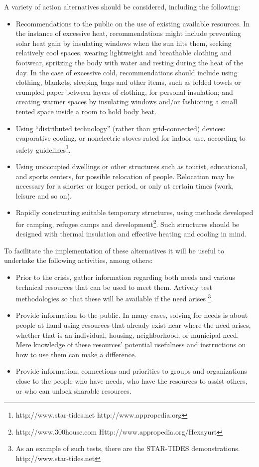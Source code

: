 \documentclass[12pt, a4]{scrartcl}
\begin{document}
A variety of action alternatives should be considered, including the following:
\begin{itemize}
	\item Recommendations to the public on the use of existing available resources. In the instance of excessive heat, recommendations might include preventing solar heat gain by insulating windows when the sun hits them, seeking relatively cool spaces, wearing lightweight and breathable clothing and footwear, spritzing the body with water and resting during the heat of the day. In the case of excessive cold, recommendations should include using clothing, blankets, sleeping bags and other items, such as folded towels or crumpled paper between layers of clothing, for personal insulation; and creating warmer spaces by insulating windows and/or fashioning a small tented space inside a room to hold body heat.
	\item Using “distributed technology” (rather than grid-connected) devices: evaporative cooling, or nonelectric stoves rated for indoor use, according to safety guidelines\footnote{http://www.star-tides.net http://www.appropedia.org}.
	\item Using unoccupied dwellings or other structures such as tourist, educational, and sports centers, for possible relocation of people. Relocation may be necessary for a shorter or longer period, or only at certain times (work, leisure and so on).
	\item Rapidly constructing suitable temporary structures, using methods developed for camping, refugee camps and development\footnote{http://www.300house.com Http://www.appropedia.org/Hexayurt}. Such structures should be designed with thermal insulation and effective heating and cooling in mind.
\end{itemize}

To facilitate the implementation of these alternatives it will be useful to undertake the following activities, among others:
\begin{itemize}
	\item Prior to the crisis, gather information regarding both needs and various technical resources that can be used to meet them. Actively test methodologies so that these will be available if the need arises \footnote{As an example of such tests, there are the STAR-TIDES demonstrations. http://www.star-tides.net}.
	\item Provide information to the public. In many cases, solving for needs is about people at hand using resources that already exist near where the need arises, whether that is an individual, housing, neighborhood, or municipal need. Mere knowledge of these resources' potential usefulness and instructions on how to use them can make a difference.
	\item Provide information, connections and priorities to groups and organizations close to the people who have needs, who have the resources to assist others, or who can unlock sharable resources.
\end{itemize}
\end{document}
